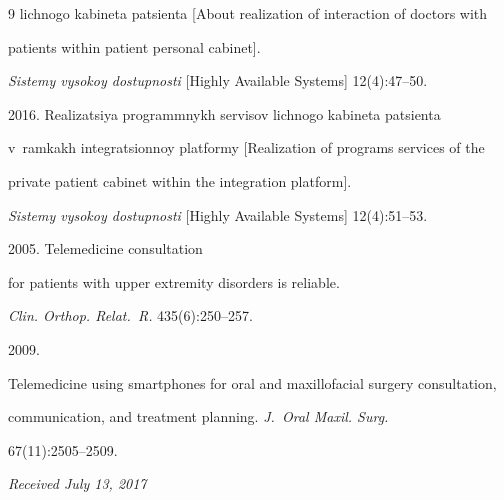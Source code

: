 {{\begin{thebibliography}{9}
lichnogo kabineta patsienta [About realization of interaction of doctors with 


patients within patient personal cabinet]. 


\textit{Sistemy vysokoy dostupnosti} [Highly Available Systems] 12(4):47--50.






2016. Realizatsiya programmnykh servisov lichnogo kabineta patsienta 


v~ramkakh integratsionnoy platformy [Realization of programs services of the 


private patient cabinet within the integration platform].


\textit{Sistemy vysokoy dostupnosti}  [Highly Available Systems] 12(4):51--53.







 2005. Telemedicine consultation 


for patients with upper extremity disorders is reliable. 


\textit{Clin. Orthop. Relat.~R.} 435(6):250--257.







 2009. 


Telemedicine using smartphones for oral and maxillofacial surgery consultation, 


communication, and treatment planning. \textit{J.~Oral Maxil. Surg.} 


67(11):2505--2509.











\end{thebibliography}


} }








\vspace*{-3pt}





\hfill{\small\textit{Received July 13, 2017}} 








